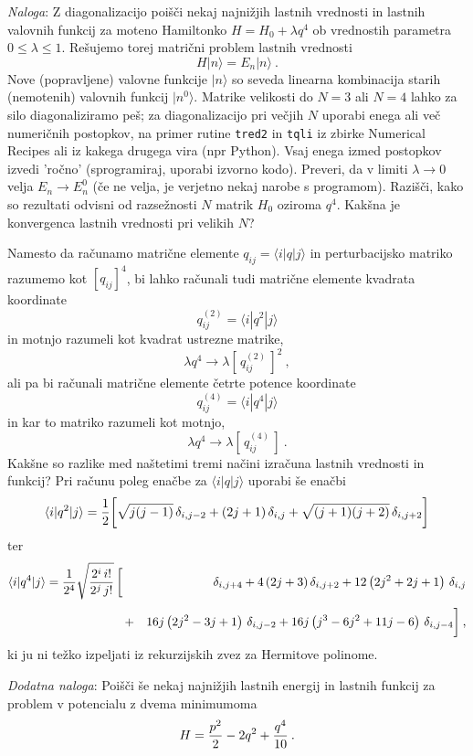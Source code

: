 \documentclass[slovene,11pt,a4paper]{article}
\begin{document}
\bigskip

{\sl Naloga\/}: Z diagonalizacijo poišči nekaj najnižjih lastnih
vrednosti in lastnih valovnih funkcij za moteno Hamiltonko
$H = H_0 + \lambda q^4$
ob vrednostih parametra $0\le\lambda\le 1$.  Rešujemo torej
matrični problem lastnih vrednosti
\begin{equation*}
  H | n \rangle = E_n | n \rangle \>.
\end{equation*}
Nove (popravljene) valovne funkcije $| n\rangle$ so seveda
linearna kombinacija starih (nemotenih) valovnih funkcij $| n^0\rangle$.
Matrike velikosti do $N=3$ ali $N=4$ lahko za silo diagonaliziramo peš;
za diagonalizacijo pri večjih $N$ uporabi enega ali več numeričnih postopkov,
na primer rutine {\tt tred2} in {\tt tqli}
iz zbirke Numerical Recipes ali iz kakega drugega vira (npr Python). Vsaj enega izmed
postopkov izvedi 'ročno' (sprogramiraj, uporabi izvorno kodo).  Preveri,
da v limiti $\lambda\to 0$ velja $E_n\to E_n^0$
(če ne velja, je verjetno nekaj narobe s programom).
Razišči, kako so rezultati odvisni od razsežnosti $N$ matrik
$H_0$ oziroma $q^4$.  Kakšna je konvergenca lastnih vrednosti
pri velikih $N$?

\bigskip

Namesto da računamo matrične elemente
$q_{ij}=\langle i | q | j \rangle$ in perturbacijsko matriko
razumemo kot $[ q_{ij} ]^4$, bi lahko računali tudi matrične
elemente kvadrata koordinate
\begin{equation*}
q^{(2)}_{ij} = \langle i | q^2 | j \rangle
\end{equation*}
in motnjo razumeli kot kvadrat ustrezne matrike,
\begin{equation*}
\lambda q^4 \to \lambda \left[ \, q^{(2)}_{ij} \,\right]^2 \>,
\end{equation*}
ali pa bi računali matrične elemente četrte potence koordinate
\begin{equation*}
q^{(4)}_{ij} = \langle i | q^4 | j \rangle
\end{equation*}
in kar to matriko razumeli kot motnjo,
\begin{equation*}
\lambda q^4 \to \lambda \left[ \, q^{(4)}_{ij} \,\right] \>.
\end{equation*}
Kakšne so razlike med naštetimi tremi načini izračuna
lastnih vrednosti in funkcij?  Pri računu poleg enačbe za $\langle i | q | j \rangle$ uporabi še enačbi
\begin{equation*}
\langle i|q^2|j\rangle
  = {1\over 2} \biggl[
    {\sqrt{j(j-1)}} \, \delta_{i,j-2}
  + {(2j+1)} \, \delta_{i,j}
  + {\sqrt{(j+1)(j+2)}} \, \delta_{i,j+2} \biggr]
\end{equation*}
ter
\begin{eqnarray*}
\langle i|q^4|j\rangle
  = {1\over 2^4}\sqrt{2^i \, i!\over 2^{j} \, j! } \, \biggl[ \,
  &\,& \delta_{i,j+4} + 4\left(2j+3\right) \delta_{i,j+2}
                      + 12 \left(2j^2+2j+1\right) \, \delta_{i,j} \\[3pt]
  &+& 16j \left(2j^2-3j+1\right) \, \delta_{i,j-2}
     + 16j\left(j^3-6j^2+11j-6\right) \, \delta_{i,j-4} \biggr] \>,
\end{eqnarray*}
ki ju ni težko izpeljati iz rekurzijskih zvez za Hermitove
polinome.

\bigskip

{\sl Dodatna naloga\/}: Poišči še nekaj najnižjih lastnih energij
in lastnih funkcij za problem v potencialu z dvema minimumoma
\begin{equation*}
H = {p^2\over 2} - 2q^2 + {q^4\over 10} \>.
\end{equation*}

\end{document}
